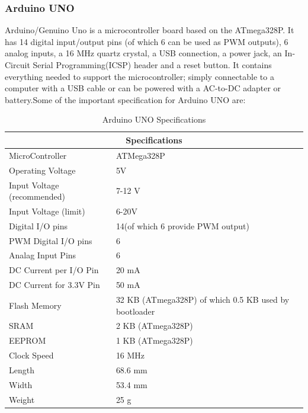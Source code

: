 \subsubsection{Arduino UNO}
Arduino/Genuino Uno is a microcontroller board based on the ATmega328P. It has 14 digital input/output pins (of which 6 can be used as PWM outputs), 6 analog inputs, a 16 MHz quartz crystal, a USB connection, a power jack, an In-Circuit Serial Programming(ICSP) header and a reset button. It contains everything needed to support the microcontroller; simply connectable to a computer with a USB cable or can be powered with a AC-to-DC adapter or battery.Some of the important specification\cite{arduino} for Arduino UNO are: 
\begin{table}
\center
\begin{tabular}{ |p{5cm}|p{7cm}| }
\hline
\multicolumn{2}{|c|}{Specifications} \\
\hline
MicroController& ATMega328P \\
\hline
Operating Voltage& 5V\\
\hline
Input Voltage (recommended) & 7-12 V\\
\hline
Input Voltage (limit) &6-20V\\
\hline
Digital I/O pins &14(of which 6 provide PWM output) \\
\hline
PWM Digital I/O pins&6\\
\hline
Analag Input Pins & 6 \\
\hline
DC Current per I/O Pin	& 20 mA\\
\hline
DC Current for 3.3V Pin	& 50 mA\\
\hline
Flash Memory	& 32 KB (ATmega328P)
of which 0.5 KB used by bootloader\\
\hline
SRAM	& 2 KB (ATmega328P)\\
\hline
EEPROM	& 1 KB (ATmega328P)\\
\hline
Clock Speed	& 16 MHz\\
\hline
Length	& 68.6 mm\\
\hline
Width	& 53.4 mm\\
\hline
Weight	& 25 g\\
\hline
\end{tabular}
\caption{Arduino UNO Specifications}
\end{table}


